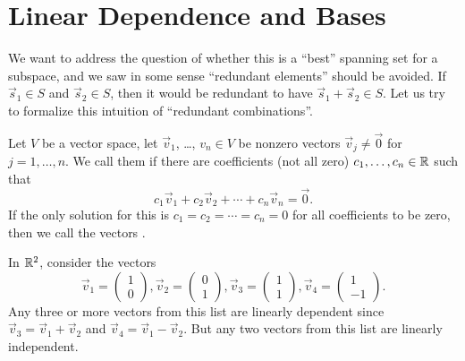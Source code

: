 \section{Linear Dependence and Bases}\label{section:basis}

\M
We want to address the question of whether this is a ``best'' spanning
set for a subspace, and we saw in some sense ``redundant elements''
should be avoided. If $\vec{s}_{1}\in S$ and $\vec{s}_{2}\in S$, then it
would be redundant to have $\vec{s}_{1}+\vec{s}_{2}\in S$. Let us try to
formalize this intuition of ``redundant combinations''.

\begin{definition}\label{defn:basis:linearly-dependent}
Let $V$ be a vector space, let $\vec{v}_{1}$, \dots, $v_{n}\in V$ be
nonzero vectors $\vec{v}_{j}\neq\vec{0}$ for $j=1,\dots,n$.
We call them  if there are coefficients (not
all zero) $c_{1},\dots,c_{n}\in\mathbb{R}$ such that
\begin{equation}
c_{1}\vec{v}_{1} + c_{2}\vec{v}_{2}+\cdots+c_{n}\vec{v}_{n}=\vec{0}.
\end{equation}
If the only solution for this is $c_{1}=c_{2}=\cdots=c_{n}=0$ for all
coefficients to be zero, then we call the vectors .
\end{definition}

\begin{example}
  In $\mathbb{R}^{2}$, consider the vectors
  \begin{equation}
\vec{v}_{1} = \begin{pmatrix} 1\\0 \end{pmatrix},
\vec{v}_{2} = \begin{pmatrix} 0\\1 \end{pmatrix},
\vec{v}_{3} = \begin{pmatrix} 1\\1 \end{pmatrix},
\vec{v}_{4} = \begin{pmatrix} 1\\-1 \end{pmatrix}.
  \end{equation}
  Any three or more vectors from this list are linearly dependent since
  $\vec{v}_{3}=\vec{v}_{1}+\vec{v}_{2}$ and
  $\vec{v}_{4}=\vec{v}_{1}-\vec{v}_{2}$. But
  any two vectors from this list are linearly independent.
\end{example}


